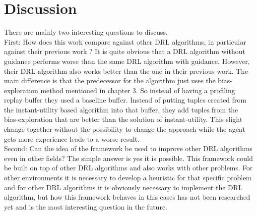 \section{Discussion} %
\label{sec:relwork}
There are mainly two interesting questions to discuss.\\
First: How does this work compare against other DRL algorithms, in particular against their previous work \cite{Guz}? It is quite obvious that a DRL algorithm without guidance performs worse than the same DRL algorithm with guidance. However, their DRL algorithm also works better than the one in their previous work. The main difference is that the predecessor for the algorithm just uses the bias-exploration method mentioned in chapter 3. %
So instead of having a profiling replay buffer they used a baseline buffer. Instead of putting tuples created from the instant-utility based algorithm into that buffer, they add tuples from the bias-exploration that are better than the solution of instant-utility. This slight change together without the possibility to change the approach while the agent gets more experience leads to a worse result.  \\

Second: Can the idea of the framework  be used to improve other DRL algorithms even in other fields?
The simple answer is yes it is possible. This framework could be built on top of other DRL algorithms and also works with other problems. For other environments it is necessary to develop a heuristic for that specific problem and for other DRL algorithms it is obviously necessary to  implement the DRL algorithm, but how this framework behaves in this cases has not been researched yet and is the most interesting question in the future.




 
